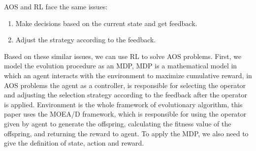 \documentclass[journal]{IEEEtran}
\begin{document}
AOS and RL face the same issues:
\begin{enumerate}
  \item Make decisions based on the current state and get feedback.
  \item Adjust the strategy according to the feedback.
\end{enumerate}
Based on these similar issues, we can use RL to solve AOS problems.
First, we model the evolution procedure as an MDP,
MDP is a mathematical model in which an agent interacts with the environment to maximize cumulative reward, in AOS problems the agent as a controller, is responsible for selecting the operator and adjusting the selection strategy according to the feedback after the operator is applied.
Environment is the whole framework of evolutionary algorithm, this paper uses the MOEA/D framework, which is responsible for using the operator given by agent to generate the offspring, calculating the fitness value of the offspring, and returning the reward to agent.
To apply the MDP, we also need to give the definition of state, action and reward.
\end{document}
